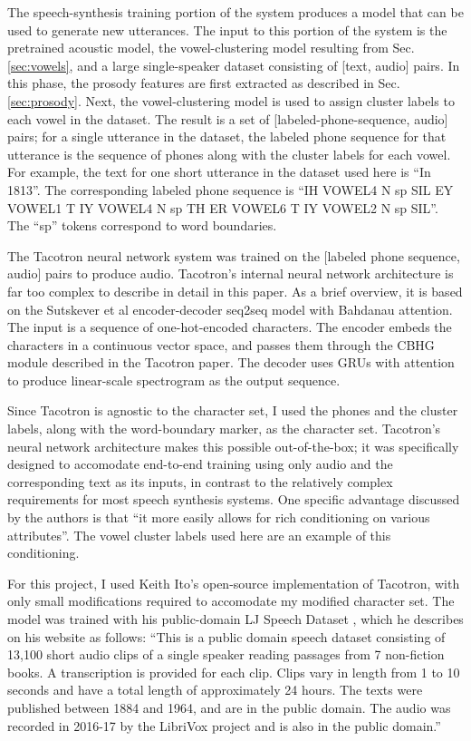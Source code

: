 \documentclass{article}
\begin{document}
The speech-synthesis training portion of the system produces a model that can be used to generate new utterances. The input to this portion of the system is the pretrained acoustic model, the vowel-clustering model resulting from Sec. \ref{sec:vowels}, and a large single-speaker dataset consisting of [text, audio] pairs.
In this phase, the prosody features are first extracted as described in Sec. \ref{sec:prosody}. Next, the vowel-clustering model is used to assign cluster labels to each vowel in the dataset.
The result is a set of [labeled-phone-sequence, audio] pairs; for a single utterance in the dataset, the labeled phone sequence for that utterance is the sequence of phones along with the cluster labels for each vowel. For example, the text for one short utterance in the dataset used here is ``In 1813''.
The corresponding labeled phone sequence is ``IH VOWEL4 N sp SIL EY VOWEL1 T IY VOWEL4 N sp TH ER VOWEL6 T IY VOWEL2 N sp SIL''. The ``sp'' tokens correspond to word boundaries.

The Tacotron \cite{wang2017tacotron} neural network system was trained on the [labeled phone sequence, audio] pairs to produce audio.
Tacotron's internal neural network architecture is far too complex to describe in detail in this paper. As a brief overview, it is based on the Sutskever et al \cite{sutskever2014sequence} encoder-decoder seq2seq model with Bahdanau \cite{bahdanau2014neural} attention. The input is a sequence of one-hot-encoded characters.
The encoder embeds the characters in a continuous vector space, and passes them through the CBHG module described in the Tacotron paper.
The decoder uses GRUs with attention to produce linear-scale spectrogram as the output sequence.

Since Tacotron is agnostic to the character set, I used the phones and the cluster labels, along with the word-boundary marker, as the character set. Tacotron's neural network architecture makes this possible out-of-the-box; it was specifically designed to accomodate end-to-end training using only audio and the corresponding text as its inputs, in contrast to the relatively complex requirements for most speech synthesis systems.
One specific advantage discussed by the authors is that ``it more easily
allows for rich conditioning on various attributes''. The vowel cluster labels used here are an example of this conditioning.

For this project, I used Keith Ito's open-source implementation of Tacotron, with only small modifications required to accomodate my modified character set. The model was trained with his public-domain LJ Speech Dataset \cite{ljspeech17}, which he describes on his website as follows:
``This is a public domain speech dataset consisting of 13,100 short audio clips of a single speaker reading passages from 7 non-fiction books. A transcription is provided for each clip. Clips vary in length from 1 to 10 seconds and have a total length of approximately 24 hours. The texts were published between 1884 and 1964, and are in the public domain. The audio was recorded in 2016-17 by the LibriVox project and is also in the public domain.''
\end{document}

